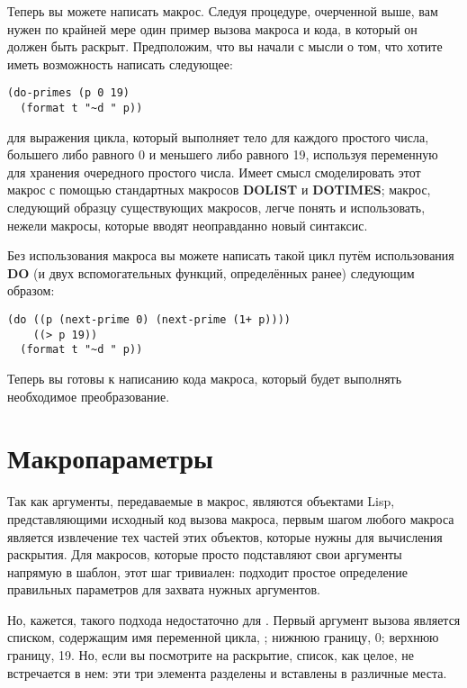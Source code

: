 Теперь вы можете написать макрос. Следуя процедуре, очерченной выше, вам нужен по крайней
мере один пример вызова макроса и кода, в который он должен быть раскрыт. Предположим, что
вы начали с мысли о том, что хотите иметь возможность написать следующее:

\begin{lstlisting}
(do-primes (p 0 19)
  (format t "~d " p))
\end{lstlisting}

для выражения цикла, который выполняет тело для каждого простого числа, большего либо
равного 0 и меньшего либо равного 19, используя переменную  для хранения
очередного простого числа. Имеет смысл смоделировать этот макрос с помощью стандартных
макросов \textbf{DOLIST} и \textbf{DOTIMES}; макрос, следующий образцу существующих
макросов, легче понять и использовать, нежели макросы, которые вводят неоправданно новый
синтаксис.

Без использования макроса  вы можете написать такой цикл путём
использования \textbf{DO} (и двух вспомогательных функций, определённых ранее) следующим
образом:

\begin{lstlisting}
(do ((p (next-prime 0) (next-prime (1+ p))))
    ((> p 19))
  (format t "~d " p))
\end{lstlisting}

Теперь вы готовы к написанию кода макроса, который будет выполнять необходимое
преобразование.

\section{Макропараметры}

Так как аргументы, передаваемые в макрос, являются объектами Lisp, представляющими
исходный код вызова макроса, первым шагом любого макроса является извлечение тех частей
этих объектов, которые нужны для вычисления раскрытия. Для макросов, которые просто
подставляют свои аргументы напрямую в шаблон, этот шаг тривиален: подходит простое
определение правильных параметров для захвата нужных аргументов.

Но, кажется, такого подхода недостаточно для . Первый аргумент вызова
 является списком, содержащим имя переменной цикла, ; нижнюю
границу, 0; верхнюю границу, 19. Но, если вы посмотрите на раскрытие, список, как целое,
не встречается в нем: эти три элемента разделены и вставлены в различные места.

